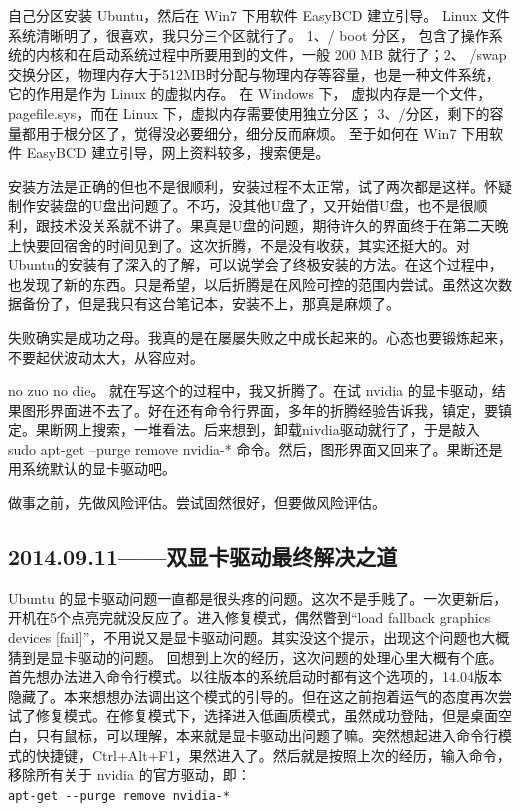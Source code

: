\documentclass[cn,11pt,chinese,twoside]{elegantbook}
\begin{document}
自己分区安装 Ubuntu，然后在 Win7 下用软件 EasyBCD 建立引导。 Linux 文件系统清晰明了，很喜欢，我只分三个区就行了。 1、/ boot 分区， 包含了操作系统的内核和在启动系统过程中所要用到的文件，一般 200 MB 就行了；2、 /swap 交换分区，物理内存大于512MB时分配与物理内存等容量，也是一种文件系统，它的作用是作为 Linux 的虚拟内存。 在 Windows 下， 虚拟内存是一个文件， pagefile.sys，而在 Linux 下，虚拟内存需要使用独立分区； 3、/分区，剩下的容量都用于根分区了，觉得没必要细分，细分反而麻烦。 至于如何在 Win7 下用软件 EasyBCD 建立引导，网上资料较多，搜索便是。

安装方法是正确的但也不是很顺利，安装过程不太正常，试了两次都是这样。怀疑制作安装盘的U盘出问题了。不巧，没其他U盘了，又开始借U盘，也不是很顺利，跟技术没关系就不讲了。果真是U盘的问题，期待许久的界面终于在第二天晚上快要回宿舍的时间见到了。这次折腾，不是没有收获，其实还挺大的。对Ubuntu的安装有了深入的了解，可以说学会了终极安装的方法。在这个过程中，也发现了新的东西。只是希望，以后折腾是在风险可控的范围内尝试。虽然这次数据备份了，但是我只有这台笔记本，安装不上，那真是麻烦了。

失败确实是成功之母。我真的是在屡屡失败之中成长起来的。心态也要锻炼起来，不要起伏波动太大，从容应对。

no zuo no die。 就在写这个的过程中，我又折腾了。在试 nvidia 的显卡驱动，结果图形界面进不去了。好在还有命令行界面，多年的折腾经验告诉我，镇定，要镇定。果断网上搜索，一堆看法。后来想到，卸载nivdia驱动就行了，于是敲入
sudo apt-get --purge remove nvidia-*
 命令。然后，图形界面又回来了。果断还是用系统默认的显卡驱动吧。

做事之前，先做风险评估。尝试固然很好，但要做风险评估。



\subsection*{2014.09.11——双显卡驱动最终解决之道}
Ubuntu 的显卡驱动问题一直都是很头疼的问题。这次不是手贱了。一次更新后，开机在5个点亮完就没反应了。进入修复模式，偶然瞥到“load fallback graphics devices [fail]”，不用说又是显卡驱动问题。其实没这个提示，出现这个问题也大概猜到是显卡驱动的问题。 回想到上次的经历，这次问题的处理心里大概有个底。首先想办法进入命令行模式。以往版本的系统启动时都有这个选项的，14.04版本隐藏了。本来想想办法调出这个模式的引导的。但在这之前抱着运气的态度再次尝试了修复模式。在修复模式下，选择进入低画质模式，虽然成功登陆，但是桌面空白，只有鼠标，可以理解，本来就是显卡驱动出问题了嘛。突然想起进入命令行模式的快捷键，Ctrl+Alt+F1，果然进入了。然后就是按照上次的经历，输入命令，移除所有关于 nvidia 的官方驱动，即：\\
\verb|apt-get --purge remove nvidia-*|
\end{document}
